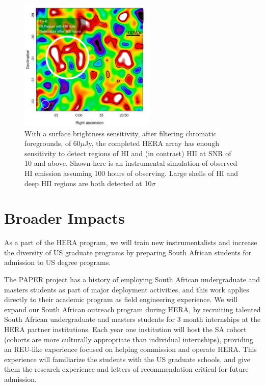 \documentclass[preprint]{aastex}
\def\HI{{H{\small I }}}
\def\HII{{H{\small II }}}
\begin{document}
\begin{figure}[t] \centering
\includegraphics[height=2.5in]{plots/HERA_z8_SNR_annotated_v2.jpg}
\caption{\small 
With a surface brightness sensitivity, after filtering chromatic foregrounds,
of 60$\mu$Jy, the completed HERA array has enough sensitivity to detect regions of
\HI and (in contrast) \HII at SNR of 10 and above. Shown here is an instrumental
simulation of observed \HI emission assuming 100 hours of observing. Large
shells of \HI and deep \HII regions are both detected at 10$\sigma$  
\label{imaging}}
\end{figure}


\vspace{-0.25in}
\section{Broader Impacts}
\label{BIsec}
As a part of the HERA program, we will train new instrumentalists and increase
the diversity of US graduate programs by preparing South African students for
admission to US degree programs.

The PAPER project has a history of employing South African undergraduate and
masters students as part of major deployment activities, and this work applies
directly to their academic program as field engineering experience.  We will
expand our South African outreach program during HERA, by recruiting talented
South African undergraduate and masters students for 3 month internships at the
HERA partner institutions. Each year one institution will host the SA cohort
(cohorts are more culturally appropriate than individual internships),
providing an REU-like experience focused on helping commission and operate
HERA. This experience will familiarize the students with the US graduate
schools, and give them the research experience and letters of recommendation
critical for future admission. 
\end{document}
